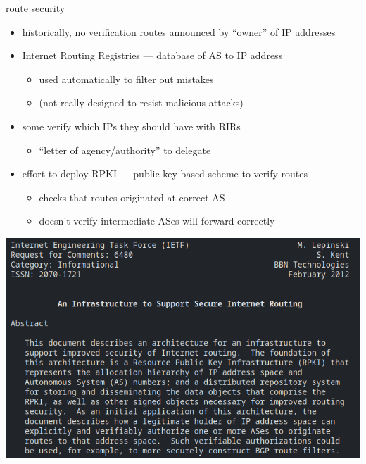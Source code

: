 \begin{frame}{route security}
    \begin{itemize}
    \item historically, no verification routes announced by ``owner'' of IP addresses
    \vspace{.5cm}
    \item Internet Routing Registries --- database of AS to IP address
        \begin{itemize}
        \item used automatically to filter out mistakes
        \item (not really designed to resist malicious attacks)
        \end{itemize}
    \item some verify which IPs they should have with RIRs
        \begin{itemize}
        \item ``letter of agency/authority'' to delegate
        \end{itemize}
    \item effort to deploy RPKI --- public-key based scheme to verify routes
        \begin{itemize}
        \item checks that routes originated at correct AS
        \item doesn't verify intermediate ASes will forward correctly
        \end{itemize}
    \end{itemize}
\end{frame}

\begin{frame}{}
\includegraphics[height=\textheight]{../routing/rpki-rfc}
\end{frame}
